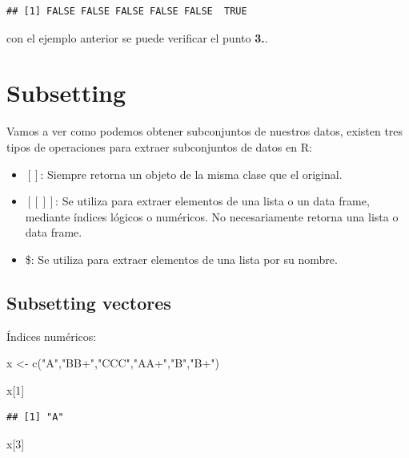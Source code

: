 \documentclass[
  12pt,
]{book}
\newenvironment{Shaded}{\begin{snugshade}}{\end{snugshade}}
\newcommand{\DecValTok}[1]{\textcolor[rgb]{0.00,0.00,0.81}{#1}}
\newcommand{\FunctionTok}[1]{\textcolor[rgb]{0.00,0.00,0.00}{#1}}
\newcommand{\NormalTok}[1]{#1}
\newcommand{\OtherTok}[1]{\textcolor[rgb]{0.56,0.35,0.01}{#1}}
\newcommand{\StringTok}[1]{\textcolor[rgb]{0.31,0.60,0.02}{#1}}
\providecommand{\tightlist}{%
  \setlength{\itemsep}{0pt}\setlength{\parskip}{0pt}}
\begin{document}
\begin{verbatim}
## [1] FALSE FALSE FALSE FALSE FALSE  TRUE
\end{verbatim}

con el ejemplo anterior se puede verificar el punto \textbf{3.}.

\hypertarget{subsetting}{%
\chapter{\texorpdfstring{\textbf{Subsetting}}{Subsetting}}\label{subsetting}}

Vamos a ver como podemos obtener subconjuntos de nuestros datos, existen tres tipos de operaciones para extraer subconjuntos de datos en R:

\begin{itemize}
\tightlist
\item
  \([ ]\): Siempre retorna un objeto de la misma clase que el original.
\item
  \([[ ]]\): Se utiliza para extraer elementos de una lista o un data frame, mediante índices lógicos o numéricos. No necesariamente retorna una lista o data frame.
\item
  \$: Se utiliza para extraer elementos de una lista por su nombre.
\end{itemize}

\hypertarget{subsetting-vectores}{%
\section{\texorpdfstring{\textbf{Subsetting vectores}}{Subsetting vectores}}\label{subsetting-vectores}}

Índices numéricos:

\begin{Shaded}
\begin{Highlighting}[]
\NormalTok{x }\OtherTok{\textless{}{-}} \FunctionTok{c}\NormalTok{(}\StringTok{"A"}\NormalTok{,}\StringTok{"BB+"}\NormalTok{,}\StringTok{"CCC"}\NormalTok{,}\StringTok{"AA+"}\NormalTok{,}\StringTok{"B"}\NormalTok{,}\StringTok{"B+"}\NormalTok{)}

\NormalTok{x[}\DecValTok{1}\NormalTok{]}
\end{Highlighting}
\end{Shaded}

\begin{verbatim}
## [1] "A"
\end{verbatim}

\begin{Shaded}
\begin{Highlighting}[]
\NormalTok{x[}\DecValTok{3}\NormalTok{]}
\end{Highlighting}
\end{Shaded}
\end{document}
